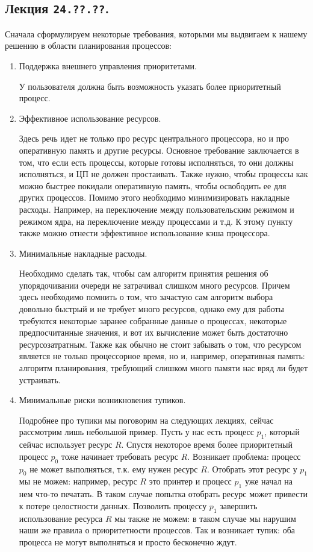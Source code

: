 \subsection{%
  Лекция \texttt{24.??.??}.%
}

Сначала сформулируем некоторые требования, которыми мы выдвигаем к нашему
решению в области планирования процессов:

\begin{enumerate}
\item
  Поддержка внешнего управления приоритетами.

  У пользователя должна быть возможность указать более приоритетный процесс. 

\item
  Эффективное использование ресурсов.

  Здесь речь идет не только про ресурс центрального процессора, но и про
  оперативную память и другие ресурсы. Основное требование заключается в том,
  что если есть процессы, которые готовы исполняться, то они должны исполняться,
  и ЦП не должен простаивать. Также нужно, чтобы процессы как можно быстрее
  покидали оперативную память, чтобы освободить ее для других процессов. Помимо
  этого необходимо минимизировать накладные расходы. Например, на переключение
  между пользовательским режимом и режимом ядра, на переключение между
  процессами и т.д. К этому пункту также можно отнести эффективное использование
  кэша процессора.

\item
  Минимальные накладные расходы.

  Необходимо сделать так, чтобы сам алгоритм принятия решения об упорядочивании
  очереди не затрачивал слишком много ресурсов. Причем здесь необходимо помнить
  о том, что зачастую сам алгоритм выбора довольно быстрый и не требует много
  ресурсов, однако ему для работы требуются некоторые заранее собранные данные
  о процессах, некоторые предпосчитанные значения, и вот их вычисление может
  быть достаточно ресурсозатратным. Также как обычно не стоит забывать о том,
  что ресурсом является не только процессорное время, но и, например,
  оперативная память: алгоритм планирования, требующий слишком много памяти нас
  вряд ли будет устраивать.

\item
  Минимальные риски возникновения тупиков.

  Подробнее про тупики мы поговорим на следующих лекциях, сейчас рассмотрим лишь
  небольшой пример. Пусть у нас есть процесс \(p_1\), который сейчас использует
  ресурс \(R\). Спустя некоторое время более приоритетный процесс \(p_0\) тоже
  начинает требовать ресурс \(R\). Возникает проблема: процесс \(p_0\) не может
  выполняться, т.к. ему нужен ресурс \(R\). Отобрать этот ресурс у \(p_1\) мы не
  можем: например, ресурс \(R\) это принтер и процесс \(p_1\) уже начал на нем
  что-то печатать. В таком случае попытка отобрать ресурс может привести к
  потере целостности данных. Позволить процессу \(p_1\) завершить использование
  ресурса \(R\) мы также не можем: в таком случае мы нарушим наши же правила о
  приоритетности процессов. Так и возникает тупик: оба процесса не могут
  выполняться и просто бесконечно ждут.
\end{enumerate}

